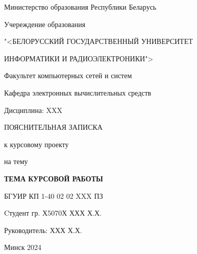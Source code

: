 \begin{centering}
  Министерство образования Республики Беларусь \par
   \bigskip
   Учереждение образования\par
   "<БЕЛОРУССКИЙ ГОСУДАРСТВЕННЫЙ УНИВЕРСИТЕТ \par
   ИНФОРМАТИКИ И РАДИОЭЛЕКТРОНИКИ">\par
   \bigskip \bigskip
\end{centering}

Факультет компьютерных сетей и систем\par\bigskip
Кафедра электронных вычислительных средств\par\bigskip
Дисциплина: XXX\par

\bigskip \bigskip \bigskip \bigskip \bigskip \bigskip 

\begin{centering}
   ПОЯСНИТЕЛЬНАЯ ЗАПИСКА \par
   к курсовому проекту\par
   на тему\par
   \bf{ТЕМА КУРСОВОЙ РАБОТЫ}\normalfont\par
   БГУИР КП 1-40 02 02 XXX ПЗ\par
\end{centering}
\bigskip \bigskip \bigskip \bigskip \bigskip \bigskip \bigskip \bigskip
\hspace*{70 mm}Cтудент гр. Х5070Х ХХХ Х.Х.\par\bigskip\bigskip
\hspace*{70 mm}Руководитель: ХХХ Х.Х.\par
\vfill \vfill 

\centerline{Минск 2024} 
\pagestyle{empty}